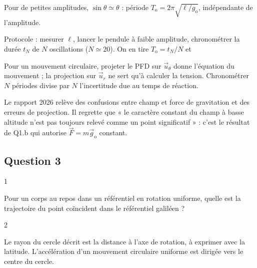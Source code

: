 \documentclass[11pt,a4paper]{article}
\newcommand{\equationajustee}[1]{%
  \sbox{\boiteequation}{$\displaystyle #1$}%
  \ifdim\wd\boiteequation>\linewidth
    \[\resizebox{\linewidth}{!}{\usebox{\boiteequation}}\]%
  \else
    \[#1\]%
  \fi}
\begin{document}
Pour de petites amplitudes, \(\sin\theta\simeq\theta\) : période \(T_{\mathrm{o}}=2\pi\sqrt{\ell/g_{\mathrm{o}}}\), indépendante de l'amplitude.

Protocole : mesurer \(\ell\), lancer le pendule à faible amplitude, chronométrer la durée \(t_N\) de \(N\) oscillations (\(N\simeq20\)). On en tire \(T_{\mathrm{o}}=t_N/N\) et

\equationajustee{\boxed{g_{\mathrm{o}}=\frac{4\pi^2\ell}{T_{\mathrm{o}}^2}}}

\begin{methode}

Pour un mouvement circulaire, projeter le PFD sur \(\vec u_\theta\) donne l'équation du mouvement ; la projection sur \(\vec u_r\) ne sert qu'à calculer la tension. Chronométrer \(N\) périodes divise par \(N\) l'incertitude due au temps de réaction.

\end{methode}

\begin{jury}

Le rapport 2026 relève des confusions entre champ et force de gravitation et des erreurs de projection. Il regrette que « le caractère constant du champ à basse altitude n'est pas toujours relevé comme un point significatif » : c'est le résultat de Q1.b qui autorise \(\vec F=m\vec g_{\mathrm{o}}\) constant.

\end{jury}

\hypertarget{question-3}{%
\subsection{Question 3}\label{question-3}}

\begin{indication}{1}

Pour un corps au repos dans un référentiel en rotation uniforme, quelle est la trajectoire du point coïncident dans le référentiel galiléen ?

\end{indication}

\begin{indication}{2}

Le rayon du cercle décrit est la distance à l'axe de rotation, à exprimer avec la latitude. L'accélération d'un mouvement circulaire uniforme est dirigée vers le centre du cercle.

\end{indication}
\end{document}
